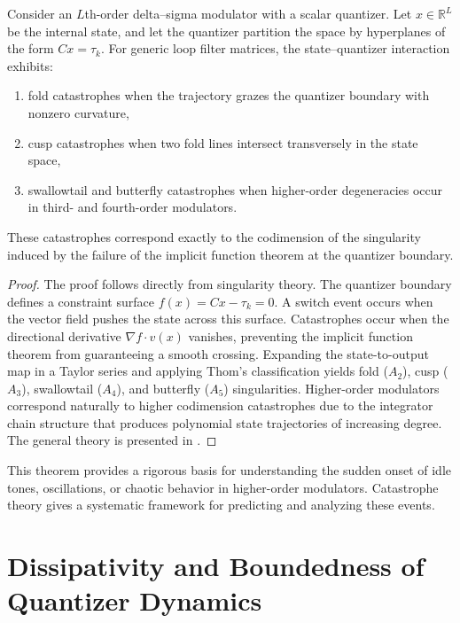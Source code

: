 \begin{theorem}
Consider an $L$th-order delta--sigma modulator with a scalar quantizer. Let $x \in \mathbb{R}^{L}$ be the internal state, and let the quantizer partition the space by hyperplanes of the form $C x = \tau_k$. For generic loop filter matrices, the state--quantizer interaction exhibits:

\begin{enumerate}
\item fold catastrophes when the trajectory grazes the quantizer boundary with nonzero curvature,
\item cusp catastrophes when two fold lines intersect transversely in the state space,
\item swallowtail and butterfly catastrophes when higher-order degeneracies occur in third- and fourth-order modulators.
\end{enumerate}

These catastrophes correspond exactly to the codimension of the singularity induced by the failure of the implicit function theorem at the quantizer boundary.
\end{theorem}

\begin{proof}
The proof follows directly from singularity theory. The quantizer boundary defines a constraint surface $f(x) = Cx - \tau_k = 0$. A switch event occurs when the vector field pushes the state across this surface. Catastrophes occur when the directional derivative $\nabla f \cdot v(x)$ vanishes, preventing the implicit function theorem from guaranteeing a smooth crossing. Expanding the state-to-output map in a Taylor series and applying Thom's classification yields fold ($A_2$), cusp ($A_3$), swallowtail ($A_4$), and butterfly ($A_5$) singularities. Higher-order modulators correspond naturally to higher codimension catastrophes due to the integrator chain structure that produces polynomial state trajectories of increasing degree. The general theory is presented in \textcite{Arnold1989MathematicalMethods}.
\end{proof}

This theorem provides a rigorous basis for understanding the sudden onset of idle tones, oscillations, or chaotic behavior in higher-order modulators. Catastrophe theory gives a systematic framework for predicting and analyzing these events.

\section{Dissipativity and Boundedness of Quantizer Dynamics}

